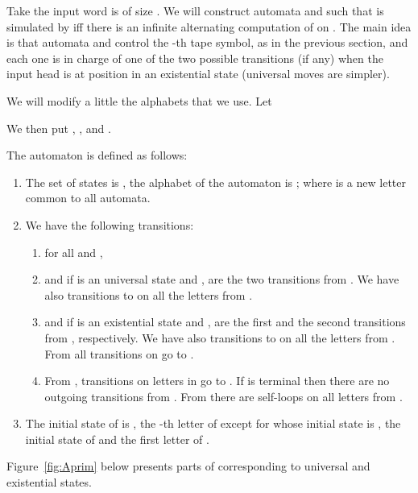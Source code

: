 \documentclass{LMCS}
\theoremstyle{plain}\newtheorem{remark}{Remark}
\theoremstyle{plain}\newtheorem{lemma}[thm]{Lemma}
\begin{document}
Take the input word is  of size . We will construct
automata  and  such that 
is simulated by  iff there is an infinite alternating
computation of  on . The main idea is that automata  and  
control the -th tape symbol, as in the previous section, and each one is in charge 
of one of the two possible transitions (if any) when the input head is
at position  in an existential state (universal moves are simpler).

We will modify a little the alphabets that we use. Let

We then put , , 
 and .

The automaton  is defined as follows:
\begin{enumerate}[]
\item The set of states is , the alphabet of the automaton is
  ; where  is a new letter common
  to all  automata.

\item We have the following transitions: 
  \begin{enumerate}[]
  \item  for all  and ,

  \item  and  if  is
    an universal state and ,  are the two
    transitions from . We have also transitions to  on all
    the letters from .

  \item  and
     if  is an existential state and
    ,  are the first and the second
    transitions from , respectively. We have also transitions to
     on all the letters from . 
     From  all transitions
    on  go to .


  \item From , transitions on letters in  go to .  If  is terminal then there are no
    outgoing transitions from .  From  there are self-loops
    on all letters from .
  \end{enumerate}

\item The initial state of  is , the -th letter
  of  except for  whose initial state is , the
  initial state of  and the first letter of .
\end{enumerate}
Figure~\ref{fig:Aprim} below presents parts of  corresponding to
universal and existential states.
\vspace{2ex}
\end{document}
